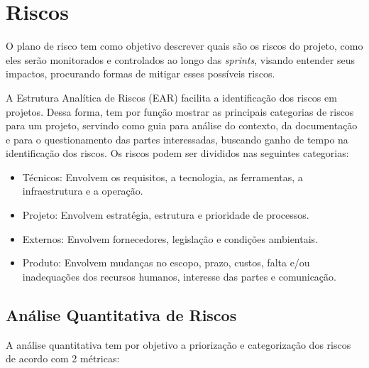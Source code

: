 \chapter[Riscos]{Riscos}

O plano de risco tem como objetivo descrever quais são os riscos do projeto, como eles serão monitorados e controlados ao longo das \textit{sprints}, visando entender seus impactos, procurando formas de mitigar esses possíveis riscos.

A Estrutura Analítica de Riscos (EAR) facilita a identificação dos riscos em projetos. Dessa forma, tem por função mostrar as principais categorias de riscos para um projeto, servindo como guia para análise do
contexto, da documentação e para o questionamento das partes interessadas, buscando
ganho de tempo na identificação dos riscos.
Os riscos podem ser divididos nas seguintes categorias:

\begin{itemize}
\item Técnicos: Envolvem os requisitos, a tecnologia, as ferramentas, a infraestrutura e a operação.
\item Projeto: Envolvem estratégia, estrutura e prioridade de processos.
\item Externos: Envolvem fornecedores, legislação e condições ambientais.
\item Produto: Envolvem mudanças no escopo, prazo, custos, falta e/ou inadequações dos recursos humanos, interesse das partes e comunicação.
\end{itemize}

\section{Análise Quantitativa de Riscos}

A análise quantitativa tem por objetivo a priorização e categorização dos riscos de acordo com 2 métricas:

